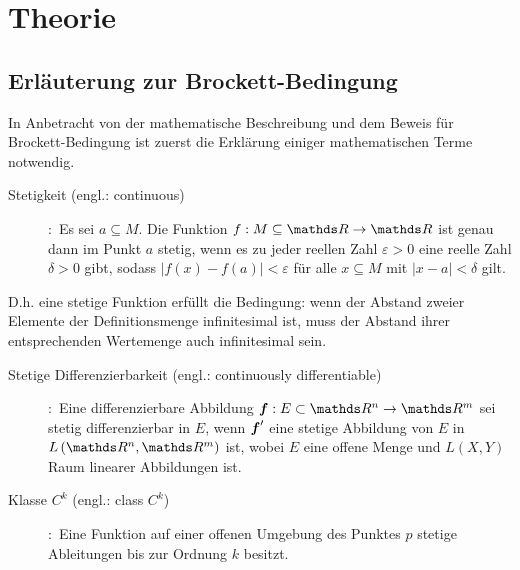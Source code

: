 \ifpdf
\graphicspath{{bild/}}
\else
\graphicspath{%
	{bild/}}
\fi


\chapter{Theorie}
\label{Theorie}
\section{Erläuterung zur Brockett-Bedingung}
\label{Erläuterung zur Brockett-Bedingung}
In Anbetracht von der mathematische Beschreibung und dem Beweis für Brockett-Bedingung ist zuerst die Erklärung einiger mathematischen Terme notwendig.    
\begin{description} 
\item[Stetigkeit (engl.: continuous)]
\cite[S.250]{grosche2003teubner}:~Es sei $a\subseteq M$. Die Funktion $f:M\subseteq\Reals\to\Reals$ ist genau dann im Punkt $a$ stetig, wenn es zu jeder reellen Zahl $\varepsilon>0$ eine reelle Zahl $\delta>0$ gibt, sodass
$\left | f\left ( x \right )-f\left ( a \right ) \right |< \varepsilon$ für alle $x\subseteq M$ mit $\left | x-a \right |< \delta $ gilt.  
\end{description}
\vspace{-0.8em}
D.h. eine stetige Funktion erfüllt die Bedingung: wenn der Abstand zweier Elemente der Definitionsmenge infinitesimal ist, muss der Abstand ihrer entsprechenden Wertemenge auch infinitesimal sein.
\begin{description}
\item[Stetige Differenzierbarkeit (engl.: continuously differentiable)]
\cite[S.256]{rudin2009analysis}:~Eine differenzierbare Abbildung $\vect{f}:E\subset\Reals^{n}\to \Reals^{m}$ sei stetig differenzierbar in $E$, wenn ${\boldsymbol f}'$ eine stetige Abbildung von $E$ in $L\left ( \Reals^{n},\Reals^{m} \right )$ ist, wobei $E$ eine offene Menge und $L\left ( X,Y \right )$ Raum linearer Abbildungen ist.
\item[Klasse $C^{k}$ (engl.: class $C^{k}$)]
\cite[S.265]{grosche2003teubner}:~Eine Funktion auf einer offenen Umgebung des Punktes $p$ stetige Ableitungen bis zur Ordnung $k$ besitzt.
\end{description}
